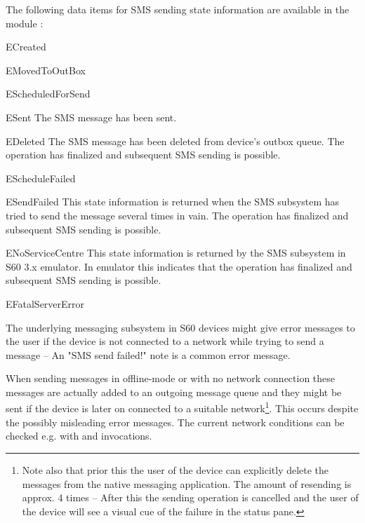 The following data items for SMS sending state information are available in 
the module :

\begin{datadesc}{ECreated}
\end{datadesc}

\begin{datadesc}{EMovedToOutBox}
\end{datadesc}

\begin{datadesc}{EScheduledForSend}
\end{datadesc}

\begin{datadesc}{ESent}
The SMS message has been sent.
\end{datadesc}

\begin{datadesc}{EDeleted}
The SMS message has been deleted from device's outbox queue. The 
 operation has finalized and subsequent SMS sending is possible.
\end{datadesc}

\begin{datadesc}{EScheduleFailed}
\end{datadesc}

\begin{datadesc}{ESendFailed}
This state information is returned when the SMS subsystem has tried to send the message 
several times in vain. The  operation has finalized and 
subsequent SMS sending is possible.
\end{datadesc}

\begin{datadesc}{ENoServiceCentre}
This state information is returned by the SMS subsystem in S60 3.x emulator. In 
emulator this indicates that the  operation has finalized and 
subsequent SMS sending is possible.
\end{datadesc}

\begin{datadesc}{EFatalServerError}
\end{datadesc}

The underlying messaging subsystem in S60 devices might give error messages to 
the user if the device is not connected to a network while trying to send a 
message -- An "SMS send failed!" note is a common error message.

When sending messages in offline-mode or with no network connection these 
messages are actually added to an outgoing message queue and they might be sent 
if the device is later on connected to a suitable network\footnote{Note also 
that prior this the user of the device can explicitly delete the messages from 
the native messaging application. The amount of resending is approx. 4 times --
After this the sending operation is cancelled and the user of the device will 
see a visual cue of the failure in the status pane.}. This occurs despite the 
possibly misleading error messages. The current network conditions can be 
checked e.g. with  and 
 invocations.

